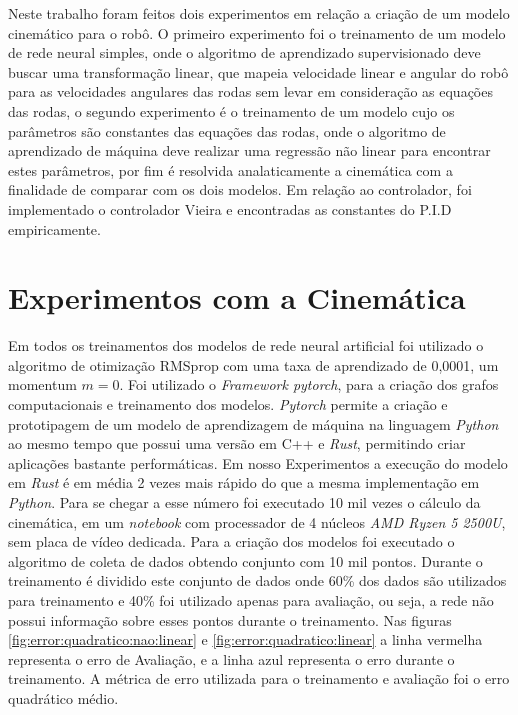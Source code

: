 
\label{Cap:ExperimentosResultados}
Neste trabalho foram feitos dois experimentos em relação a criação
de um modelo cinemático para o robô. O primeiro experimento foi o
treinamento de um modelo de rede neural simples, onde o algoritmo
de aprendizado supervisionado deve buscar uma transformação linear,
que mapeia velocidade linear e angular do robô para as velocidades
angulares das rodas sem levar em consideração as equações das rodas,
o segundo experimento é o treinamento de um modelo cujo os parâmetros
são constantes das equações das rodas, onde o algoritmo de aprendizado
de máquina deve realizar uma regressão não linear para encontrar
estes parâmetros, por fim é resolvida analaticamente a cinemática
com a finalidade de comparar com os dois modelos. Em relação ao controlador,
foi implementado o controlador Vieira e encontradas as constantes do P.I.D
empiricamente.


\section{Experimentos com a Cinemática}
Em todos os treinamentos dos modelos
de rede neural artificial foi utilizado o algoritmo de otimização
RMSprop com uma taxa de aprendizado de 0,0001, um momentum $m =0$.
Foi utilizado o \textit{Framework pytorch}, para a criação dos
grafos computacionais e treinamento dos modelos. \textit{Pytorch}
permite a criação e prototipagem de um modelo de aprendizagem de
máquina na linguagem \textit{Python} ao mesmo tempo que possui
uma versão em C++ e \textit{Rust}, permitindo criar aplicações
bastante performáticas. Em nosso Experimentos a execução do modelo
em \textit{Rust} é em média 2 vezes mais rápido do que a mesma implementação
em \textit{Python}. Para se chegar a esse número foi executado 10 mil vezes o cálculo
da cinemática, em um \textit{notebook} com processador de 4 núcleos \textit{AMD Ryzen 5 2500U},
sem placa de vídeo dedicada. Para a criação dos modelos foi executado o
algoritmo de coleta de dados obtendo conjunto com 10 mil
pontos. Durante o treinamento é dividido este conjunto de dados
onde 60\% dos dados são utilizados para treinamento e 40\% foi utilizado
apenas para avaliação, ou seja, a rede não possui informação sobre esses
pontos durante o treinamento. Nas figuras \ref{fig:error:quadratico:nao:linear} e
\ref{fig:error:quadratico:linear} a linha vermelha representa o erro de
Avaliação, e a linha azul representa o erro durante o treinamento.
A métrica de erro utilizada para o treinamento e avaliação
foi o erro quadrático médio.

